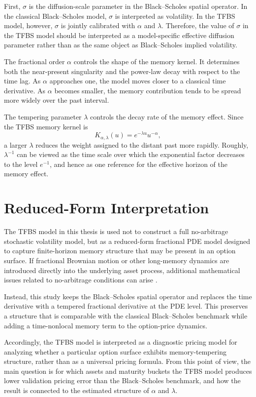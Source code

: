 \documentclass[11pt,a4paper]{report}
\begin{document}
First, $\sigma$ is the diffusion-scale parameter in the Black--Scholes spatial operator. In the classical Black--Scholes model, $\sigma$ is interpreted as volatility. In the TFBS model, however, $\sigma$ is jointly calibrated with $\alpha$ and $\lambda$. Therefore, the value of $\sigma$ in the TFBS model should be interpreted as a model-specific effective diffusion parameter rather than as the same object as Black--Scholes implied volatility.

The fractional order $\alpha$ controls the shape of the memory kernel. It determines both the near-present singularity and the power-law decay with respect to the time lag. As $\alpha$ approaches one, the model moves closer to a classical time derivative. As $\alpha$ becomes smaller, the memory contribution tends to be spread more widely over the past interval.

The tempering parameter $\lambda$ controls the decay rate of the memory effect. Since the TFBS memory kernel is
\[
K_{\alpha,\lambda}(u)
=
e^{-\lambda u}u^{-\alpha},
\]
a larger $\lambda$ reduces the weight assigned to the distant past more rapidly. Roughly, $\lambda^{-1}$ can be viewed as the time scale over which the exponential factor decreases to the level $e^{-1}$, and hence as one reference for the effective horizon of the memory effect.

\section{Reduced-Form Interpretation}

The TFBS model in this thesis is used not to construct a full no-arbitrage stochastic volatility model, but as a reduced-form fractional PDE model designed to capture finite-horizon memory structure that may be present in an option surface. If fractional Brownian motion or other long-memory dynamics are introduced directly into the underlying asset process, additional mathematical issues related to no-arbitrage conditions can arise \cite{Cheridito2003}.

Instead, this study keeps the Black--Scholes spatial operator and replaces the time derivative with a tempered fractional derivative at the PDE level. This preserves a structure that is comparable with the classical Black--Scholes benchmark while adding a time-nonlocal memory term to the option-price dynamics.

Accordingly, the TFBS model is interpreted as a diagnostic pricing model for analyzing whether a particular option surface exhibits memory-tempering structure, rather than as a universal pricing formula. From this point of view, the main question is for which assets and maturity buckets the TFBS model produces lower validation pricing error than the Black--Scholes benchmark, and how the result is connected to the estimated structure of $\alpha$ and $\lambda$.
\end{document}
